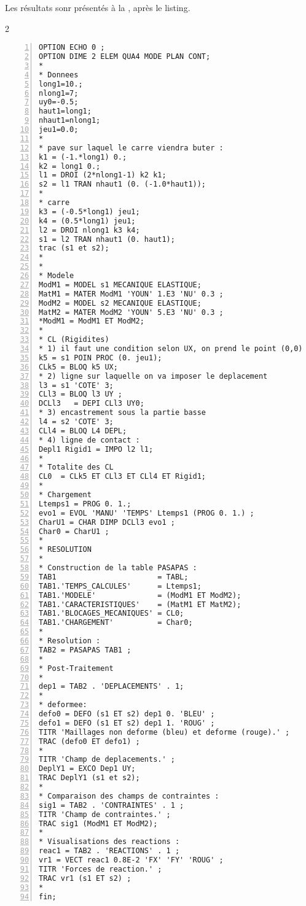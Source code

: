 \medskip
Les résultats sonr présentés à la , après le listing.

\color{gris}\scriptsize
\begin{multicols}{2}
\begin{Verbatim}[numbers=left,numbersep=3pt]
OPTION ECHO 0 ;
OPTION DIME 2 ELEM QUA4 MODE PLAN CONT;
*
* Donnees
long1=10.;
nlong1=7;
uy0=-0.5;
haut1=long1;
nhaut1=nlong1;
jeu1=0.0;
*
* pave sur laquel le carre viendra buter :
k1 = (-1.*long1) 0.;
k2 = long1 0.;
l1 = DROI (2*nlong1-1) k2 k1;
s2 = l1 TRAN nhaut1 (0. (-1.0*haut1));
*
* carre
k3 = (-0.5*long1) jeu1;
k4 = (0.5*long1) jeu1;
l2 = DROI nlong1 k3 k4;
s1 = l2 TRAN nhaut1 (0. haut1);
trac (s1 et s2);
*
*
* Modele
ModM1 = MODEL s1 MECANIQUE ELASTIQUE;
MatM1 = MATER ModM1 'YOUN' 1.E3 'NU' 0.3 ;
ModM2 = MODEL s2 MECANIQUE ELASTIQUE;
MatM2 = MATER ModM2 'YOUN' 5.E3 'NU' 0.3 ;
*ModM1 = ModM1 ET ModM2;
*
* CL (Rigidites)
* 1) il faut une condition selon UX, on prend le point (0,0)
k5 = s1 POIN PROC (0. jeu1);
CLk5 = BLOQ k5 UX;
* 2) ligne sur laquelle on va imposer le deplacement
l3 = s1 'COTE' 3;
CLl3 = BLOQ l3 UY ;
DCLl3   = DEPI CLl3 UY0;
* 3) encastrement sous la partie basse
l4 = s2 'COTE' 3;
CLl4 = BLOQ L4 DEPL;
* 4) ligne de contact :
Depl1 Rigid1 = IMPO l2 l1;
*
* Totalite des CL
CL0  = CLk5 ET CLl3 ET CLl4 ET Rigid1;
*
* Chargement
Ltemps1 = PROG 0. 1.;
evo1 = EVOL 'MANU' 'TEMPS' Ltemps1 (PROG 0. 1.) ;
CharU1 = CHAR DIMP DCLl3 evo1 ;
Char0 = CharU1 ;
*
* RESOLUTION
*
* Construction de la table PASAPAS :
TAB1                       = TABL;
TAB1.'TEMPS_CALCULES'      = Ltemps1;
TAB1.'MODELE'              = (ModM1 ET ModM2);
TAB1.'CARACTERISTIQUES'    = (MatM1 ET MatM2);
TAB1.'BLOCAGES_MECANIQUES' = CL0;
TAB1.'CHARGEMENT'          = Char0;
*
* Resolution :
TAB2 = PASAPAS TAB1 ;
*
* Post-Traitement
*
dep1 = TAB2 . 'DEPLACEMENTS' . 1;
*
* deformee:
defo0 = DEFO (s1 ET s2) dep1 0. 'BLEU' ;
defo1 = DEFO (s1 ET s2) dep1 1. 'ROUG' ;
TITR 'Maillages non deforme (bleu) et deforme (rouge).' ;
TRAC (defo0 ET defo1) ;
*
TITR 'Champ de deplacements.' ;
DeplY1 = EXCO Dep1 UY;
TRAC DeplY1 (s1 et s2);
*
* Comparaison des champs de contraintes :
sig1 = TAB2 . 'CONTRAINTES' . 1 ;
TITR 'Champ de contraintes.' ;
TRAC sig1 (ModM1 ET ModM2);
*
* Visualisations des reactions :
reac1 = TAB2 . 'REACTIONS' . 1 ;
vr1 = VECT reac1 0.8E-2 'FX' 'FY' 'ROUG' ;
TITR 'Forces de reaction.' ;
TRAC vr1 (s1 ET s2) ;
*
fin;
\end{Verbatim}
\end{multicols}
\color{black}\normalsize

